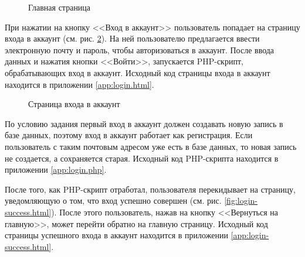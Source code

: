 \documentclass[a4paper, 14pt]{extarticle}
\begin{document}
\begin{figure}[H]
  \centering
  \caption{Главная страница}
  \label{fig:index.html}
\end{figure}

При нажатии на кнопку <<Вход в аккаунт>> пользователь попадает на страницу входа
в аккаунт (см. рис. \ref{fig:login.html}). На ней пользователю предлагается
ввести электронную почту и пароль, чтобы авторизоваться в аккаунт. После ввода
данных и нажатия кнопки <<Войти>>, запускается PHP-скрипт, обрабатывающих вход в
аккаунт. Исходный код страницы входа в аккаунт находится в приложении
\ref{app:login.html}.

\begin{figure}[H]
  \centering
  \caption{Страница входа в аккаунт}
  \label{fig:login.html}
\end{figure}

По условию задания первый вход в аккаунт должен создавать новую запись в базе
данных, поэтому вход в аккаунт работает как регистрация. Если пользователь с
таким почтовым адресом уже есть в базе данных, то новая запись не создается, а
сохраняется старая. Исходный код PHP-скрипта находится в приложении
\ref{app:login.php}.

После того, как PHP-скрипт отработал, пользователя перекидывает на страницу,
уведомляющую о том, что вход успешно совершен (см. рис.
\ref{fig:login-success.html}). После этого пользователь, нажав на кнопку
<<Вернуться на главную>>, может перейти обратно на главную страницу. Исходный
код страницы успешного входа в аккаунт находится в приложении
\ref{app:login-success.html}.
\end{document}
